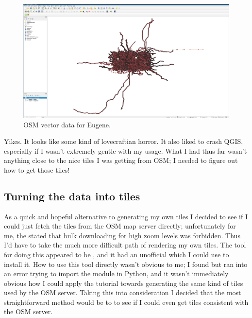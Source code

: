 \documentclass{article}
\begin{document}
\begin{figure}
\includegraphics{files/blog/2022_04_17_generating_openstreetmap_tiles_for_offline_slippy_maps/2022_04_17_eugene.png}
\caption{OSM vector data for Eugene.}
\end{figure}

Yikes.  It looks like some kind of lovecraftian horror.  It also liked to crash QGIS, especially if I wasn't extremely gentle with my usage.  What I had thus far wasn't anything close to the nice tiles I was getting from OSM; I needed to figure out how to get those tiles!

\subsection{Turning the data into tiles}
As a quick and hopeful alternative to generating my own tiles I decided to see if I could just fetch the tiles from the OSM map server directly; unfortunately for me, the  stated that bulk downloading for high zoom levels was forbidden.  Thus I'd have to take the much more difficult path of rendering my own tiles.  The tool for doing this appeared to be , and it had an unofficial  which I could use to install it.  How to use this tool directly wasn't obvious to me; I found  but ran into an error trying to import the module in Python, and it wasn't immediately obvious how I could apply the tutorial towards generating the same kind of tiles used by the OSM server.  Taking this into consideration I decided that the most straightforward method would be to  to see if I could even get tiles consistent with the OSM server.
\end{document}
